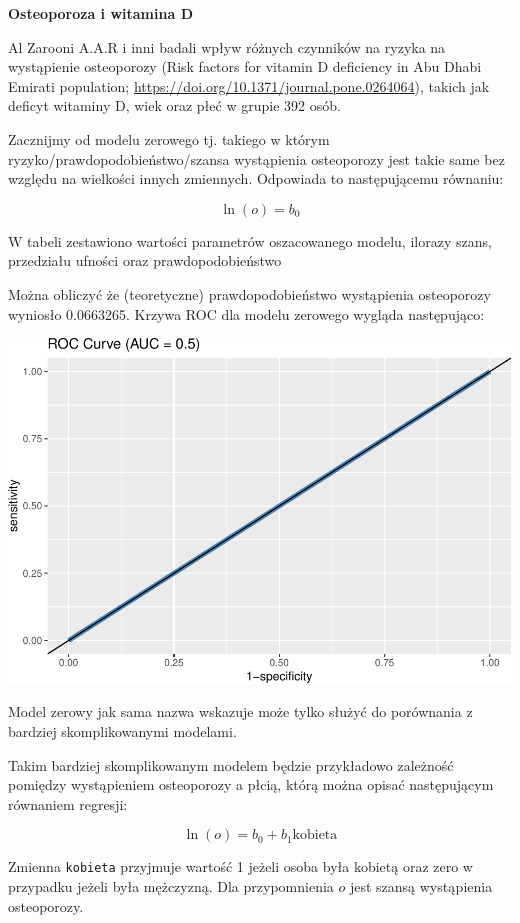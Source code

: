 \documentclass[
  openany]{book}
\begin{document}
\begin{example}
\textbf{Osteoporoza i witamina D}

Al Zarooni A.A.R i inni badali wpływ różnych czynników na ryzyka na
wystąpienie osteoporozy (Risk factors for vitamin D deficiency
in Abu Dhabi Emirati population; \url{https://doi.org/10.1371/journal.pone.0264064}),
takich jak deficyt witaminy D, wiek oraz płeć w grupie 392 osób.

Zacznijmy od modelu zerowego tj. takiego w którym ryzyko/prawdopodobieństwo/szansa
wystąpienia osteoporozy jest takie same bez względu na wielkości innych zmiennych.
Odpowiada to następującemu równaniu:

\[\ln(o) = b_0\]

W tabeli zestawiono wartości parametrów oszacowanego modelu, ilorazy szans, przedziału ufności
oraz prawdopodobieństwo

Można obliczyć że (teoretyczne) prawdopodobieństwo wystąpienia osteoporozy
wyniosło 0.0663265. Krzywa ROC dla modelu zerowego wygląda następująco:

\includegraphics{_main_files/figure-latex/unnamed-chunk-73-1.pdf}

Model zerowy jak sama nazwa wskazuje może tylko służyć do porównania
z bardziej skomplikowanymi modelami.

Takim bardziej skomplikowanym modelem będzie przykładowo
zależność pomiędzy wystąpieniem osteoporozy a płcią, którą
można opisać następującym równaniem regresji:

\[\ln(o) = b_0 + b_1 \textrm{kobieta}\]

Zmienna \texttt{kobieta} przyjmuje wartość 1 jeżeli osoba była kobietą
oraz zero w przypadku jeżeli była mężczyzną.
Dla przypomnienia \(o\) jest szansą wystąpienia osteoporozy.


\end{example}
\end{document}
